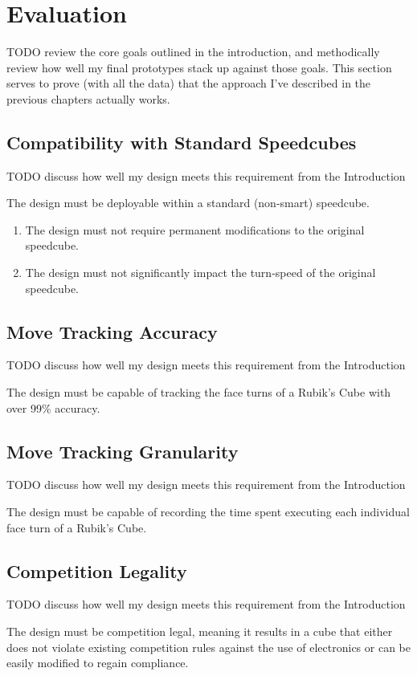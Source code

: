
\chapter{Evaluation} %

\label{Chapter7} %

TODO review the core goals outlined in the introduction, and methodically review how well my final prototypes stack up against those goals. This section serves to prove (with all the data) that the approach I've described in the previous chapters actually works.


\section{Compatibility with Standard Speedcubes}

TODO discuss how well my design meets this requirement from the Introduction

The design must be deployable within a standard (non-smart) speedcube.
\begin{enumerate} 
    \item The design must not require permanent modifications to the original speedcube.
    \item The design must not significantly impact the turn-speed of the original speedcube.
\end{enumerate}


\section{Move Tracking Accuracy}

TODO discuss how well my design meets this requirement from the Introduction

The design must be capable of tracking the face turns of a Rubik's Cube with over 99\% accuracy.


\section{Move Tracking Granularity}

TODO discuss how well my design meets this requirement from the Introduction

The design must be capable of recording the time spent executing each individual face turn of a Rubik's Cube.


\section{Competition Legality}

TODO discuss how well my design meets this requirement from the Introduction

The design must be competition legal, meaning it results in a cube that either does not violate existing competition rules against the use of electronics or can be easily modified to regain compliance.

